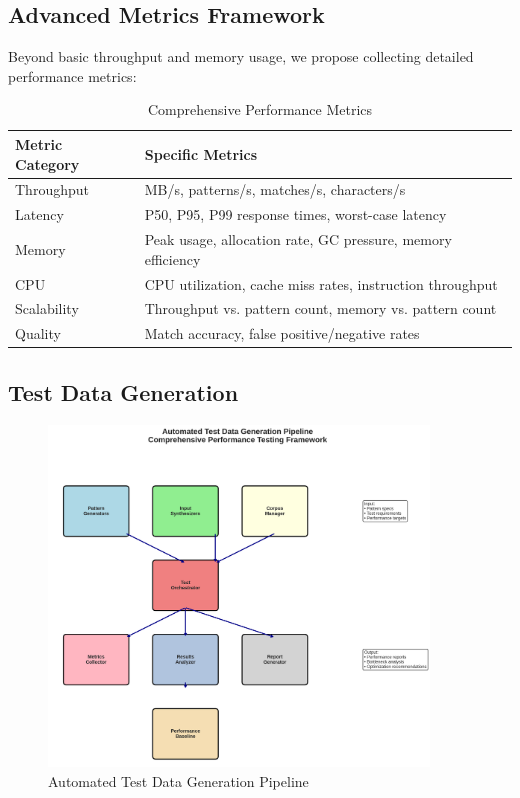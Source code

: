 \documentclass[11pt,a4paper]{article}
\begin{document}
\subsection{Advanced Metrics Framework}

Beyond basic throughput and memory usage, we propose collecting detailed performance metrics:

\begin{table}[H]
\centering
\begin{tabular}{@{}lp{8cm}@{}}
\toprule
\textbf{Metric Category} & \textbf{Specific Metrics} \\
\midrule
Throughput & MB/s, patterns/s, matches/s, characters/s \\
Latency & P50, P95, P99 response times, worst-case latency \\
Memory & Peak usage, allocation rate, GC pressure, memory efficiency \\
CPU & CPU utilization, cache miss rates, instruction throughput \\
Scalability & Throughput vs. pattern count, memory vs. pattern count \\
Quality & Match accuracy, false positive/negative rates \\
\bottomrule
\end{tabular}
\caption{Comprehensive Performance Metrics}
\label{tab:metrics}
\end{table}

\subsection{Test Data Generation}

\begin{figure}[H]
\centering
\includegraphics[width=0.9\textwidth]{illustrations/test_generation_pipeline.png}
\caption{Automated Test Data Generation Pipeline}
\label{fig:test_generation}
\end{figure}
\end{document}
